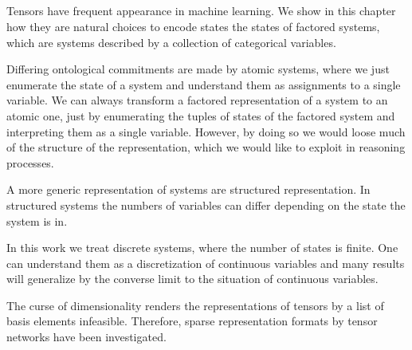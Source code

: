 \subsection{\focusonespec}


Tensors have frequent appearance in machine learning.
We show in this chapter how they are natural choices to encode states the states of factored systems, which are systems described by a collection of categorical variables.

Differing ontological commitments are made by atomic systems, where we just enumerate the state of a system and understand them as assignments to a single variable.
We can always transform a factored representation of a system to an atomic one, just by enumerating the tuples of states of the factored system and interpreting them as a single variable.
However, by doing so we would loose much of the structure of the representation, which we would like to exploit in reasoning processes.


A more generic representation of systems are structured representation.
In structured systems the numbers of variables can differ depending on the state the system is in.

In this work we treat discrete systems, where the number of states is finite.
One can understand them as a discretization of continuous variables and many results will generalize by the converse limit to the situation of continuous variables.


The curse of dimensionality renders the representations of tensors by a list of basis elements infeasible.
Therefore, sparse representation formats by tensor networks have been investigated.

\subsection{\focustwospec}

